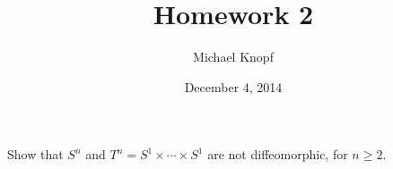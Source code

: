\documentclass[12pt]{article}
\newenvironment{exercise}[2][Exercise]{\begin{trivlist}
\item[\hskip \labelsep {\bfseries #1}\hskip \labelsep {\bfseries #2.}]}{\end{trivlist}}
\begin{document}
 
 
\title{Homework 2}
\author{Michael Knopf}
\date{December 4, 2014}
 
\maketitle



\begin{exercise}{1}

Show that $S^n$ and $T^n = S^1 \times \cdots \times S^1$ are not diffeomorphic, for $n \geq 2$.

\end{exercise}
\end{document}
